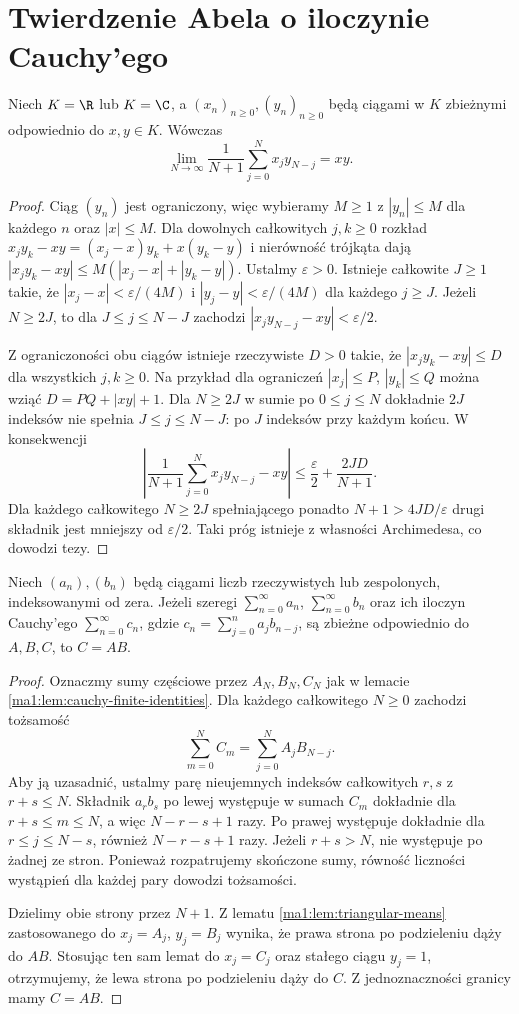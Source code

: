 \section{Twierdzenie Abela o iloczynie Cauchy'ego}
\begin{lemat}
\label{ma1:lem:triangular-means}
Niech $K=\R$ lub $K=\C$, a $(x_n)_{n\ge0},(y_n)_{n\ge0}$ będą ciągami w $K$ zbieżnymi odpowiednio do $x,y\in K$. Wówczas
\[
 \lim_{N\to\infty}\frac1{N+1}\sum_{j=0}^N x_jy_{N-j}=xy.
\]
\end{lemat}
\begin{proof}
Ciąg $(y_n)$ jest ograniczony, więc wybieramy $M\ge1$ z $|y_n|\le M$ dla każdego $n$ oraz $|x|\le M$. Dla dowolnych całkowitych $j,k\ge0$ rozkład $x_jy_k-xy=(x_j-x)y_k+x(y_k-y)$ i nierówność trójkąta dają
$|x_jy_k-xy|\le M(|x_j-x|+|y_k-y|)$.
Ustalmy $\varepsilon>0$. Istnieje całkowite $J\ge1$ takie, że $|x_j-x|<\varepsilon/(4M)$ i $|y_j-y|<\varepsilon/(4M)$ dla każdego $j\ge J$. Jeżeli $N\ge2J$, to dla $J\le j\le N-J$ zachodzi $|x_jy_{N-j}-xy|<\varepsilon/2$.

Z ograniczoności obu ciągów istnieje rzeczywiste $D>0$ takie, że $|x_jy_k-xy|\le D$ dla wszystkich $j,k\ge0$. Na przykład dla ograniczeń $|x_j|\le P$, $|y_k|\le Q$ można wziąć $D=PQ+|xy|+1$. Dla $N\ge2J$ w sumie po $0\le j\le N$ dokładnie $2J$ indeksów nie spełnia $J\le j\le N-J$: po $J$ indeksów przy każdym końcu. W konsekwencji
\[
 \left|\frac1{N+1}\sum_{j=0}^N x_jy_{N-j}-xy\right|
 \le \frac{\varepsilon}{2}+\frac{2JD}{N+1}.
\]
Dla każdego całkowitego $N\ge2J$ spełniającego ponadto $N+1>4JD/\varepsilon$ drugi składnik jest mniejszy od $\varepsilon/2$. Taki próg istnieje z własności Archimedesa, co dowodzi tezy.
\end{proof}
\begin{twierdzenie}
\label{ma1:thm:abel-cauchy-product}
Niech $(a_n),(b_n)$ będą ciągami liczb rzeczywistych lub zespolonych, indeksowanymi od zera. Jeżeli szeregi $\sum_{n=0}^\infty a_n$, $\sum_{n=0}^\infty b_n$ oraz ich iloczyn Cauchy'ego $\sum_{n=0}^\infty c_n$, gdzie $c_n=\sum_{j=0}^n a_jb_{n-j}$, są zbieżne odpowiednio do $A,B,C$, to $C=AB$.
\end{twierdzenie}
\begin{proof}
Oznaczmy sumy częściowe przez $A_N,B_N,C_N$ jak w lemacie \ref{ma1:lem:cauchy-finite-identities}. Dla każdego całkowitego $N\ge0$ zachodzi tożsamość
\[
 \sum_{m=0}^N C_m=\sum_{j=0}^N A_j B_{N-j}.
\]
Aby ją uzasadnić, ustalmy parę nieujemnych indeksów całkowitych $r,s$ z $r+s\le N$. Składnik $a_rb_s$ po lewej występuje w sumach $C_m$ dokładnie dla $r+s\le m\le N$, a więc $N-r-s+1$ razy. Po prawej występuje dokładnie dla $r\le j\le N-s$, również $N-r-s+1$ razy. Jeżeli $r+s>N$, nie występuje po żadnej ze stron. Ponieważ rozpatrujemy skończone sumy, równość liczności wystąpień dla każdej pary dowodzi tożsamości.

Dzielimy obie strony przez $N+1$. Z lematu \ref{ma1:lem:triangular-means} zastosowanego do $x_j=A_j$, $y_j=B_j$ wynika, że prawa strona po podzieleniu dąży do $AB$. Stosując ten sam lemat do $x_j=C_j$ oraz stałego ciągu $y_j=1$, otrzymujemy, że lewa strona po podzieleniu dąży do $C$. Z jednoznaczności granicy mamy $C=AB$.
\end{proof}
